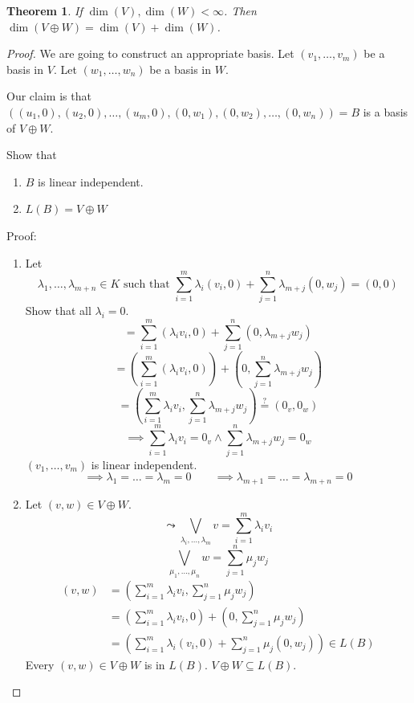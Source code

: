 \documentclass[a4paper,landscape,twocolumn]{article}
\newtheorem{theorem}{Theorem}[section]
\begin{document}
\begin{theorem}
  \label{satz-4-17}
  If $\dim(V), \dim(W) < \infty$. Then $\dim(V \oplus W) = \dim(V) + \dim(W)$.
\end{theorem}
\begin{proof}
  We are going to construct an appropriate basis.
  Let $(v_1, \dots, v_m)$ be a basis in $V$.
  Let $(w_1, \dots, w_n)$ be a basis in $W$.

  Our claim is that $((u_1, 0), (u_2, 0), \dots, (u_m, 0), (0, w_1), (0, w_2), \dots, (0, w_n)) = B$
  is a basis of $V \oplus W$.

  Show that
  \begin{enumerate}
    \item $B$ is linear independent.
    \item $L(B) = V \oplus W$
  \end{enumerate}

  Proof:
  \begin{enumerate}
    \item Let
      \[ \lambda_1, \dots, \lambda_{m+n} \in K \text{ such that } \sum_{i=1}^{m} \lambda_i (v_i, 0) + \sum_{j=1}^n \lambda_{m+j} (0, w_j) = (0, 0) \]
      Show that all $\lambda_i = 0$.
      \[ = \sum_{i=1}^m (\lambda_i v_i, 0) + \sum_{j=1}^n (0, \lambda_{m+j} w_j) \]
      \[ = \left(\sum_{i=1}^m (\lambda_i v_i, 0)\right) + \left(0, \sum_{j=1}^n \lambda_{m+j} w_j\right) \]
      \[ = \left(\sum_{i=1}^m \lambda_i v_i, \sum_{j=1}^n \lambda_{m+j} w_j\right) \stackrel{?}{=} (0_v, 0_w) \]
      \[ \implies \sum_{i=1}^m \lambda_i v_i = 0_v \land \sum_{j=1}^n \lambda_{m+j} w_j = 0_w \]
      $(v_1, \dots, v_m)$ is linear independent.
      \[ \implies \lambda_1 = \dots = \lambda_m = 0 \qquad \implies \lambda_{m+1} = \dots = \lambda_{m+n} = 0 \]
    \item Let $(v, w) \in V \oplus W$.
      \[ \leadsto \bigvee_{\lambda_i, \dots, \lambda_m} v = \sum_{i=1}^m \lambda_i v_i \]
      \[ \bigvee_{\mu_1, \dots, \mu_n} w = \sum_{j=1}^n \mu_j w_j \]
      \begin{align*}
        (v, w) &= \left(\sum_{i=1}^m \lambda_i v_i, \sum_{j=1}^n \mu_j w_j \right) \\
               &= \left(\sum_{i=1}^m \lambda_i v_i, 0\right) + \left(0, \sum_{j=1}^n \mu_j w_j\right) \\
               &= \left(\sum_{i=1}^m \lambda_i (v_i, 0) + \sum_{j=1}^n \mu_j (0, w_j)\right) \in L(B)
      \end{align*}
      Every $(v, w) \in V \oplus W$ is in $L(B)$. $V \oplus W \subseteq L(B)$.
  \end{enumerate}
\end{proof}
\end{document}
